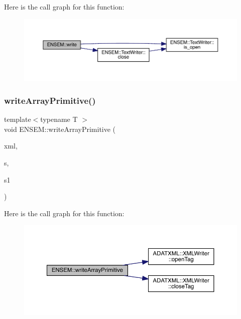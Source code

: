 Here is the call graph for this function\+:\nopagebreak
\begin{figure}[H]
\begin{center}
\leavevmode
\includegraphics[width=350pt]{d2/d94/namespaceENSEM_a2159da8c0a7ad6eec6b0d7179f0251e8_cgraph}
\end{center}
\end{figure}
\mbox{\label{namespaceENSEM_aa9532f5b330c3180eaff3decbb77eb4b}} 
\subsubsection{\texorpdfstring{writeArrayPrimitive()}{writeArrayPrimitive()}}
{\footnotesize\ttfamily template$<$typename T $>$ \\
void E\+N\+S\+E\+M\+::write\+Array\+Primitive (\begin{DoxyParamCaption}\item[{\mbox{\hyperlink{classADATXML_1_1XMLWriter}{X\+M\+L\+Writer}} \&}]{xml,  }\item[{const std\+::string \&}]{s,  }\item[{const \mbox{\hyperlink{classXMLArray_1_1Array}{Array}}$<$ T $>$ \&}]{s1 }\end{DoxyParamCaption})}

Here is the call graph for this function\+:\nopagebreak
\begin{figure}[H]
\begin{center}
\leavevmode
\includegraphics[width=350pt]{d2/d94/namespaceENSEM_aa9532f5b330c3180eaff3decbb77eb4b_cgraph}
\end{center}
\end{figure}


